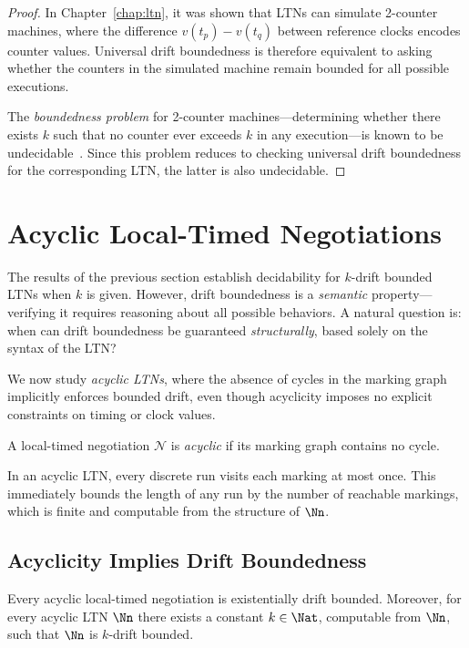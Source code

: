 \begin{proof}
In Chapter~\ref{chap:ltn}, it was shown that LTNs can simulate 2-counter machines, where the difference $v(t_p) - v(t_q)$ between reference clocks encodes counter values. Universal drift boundedness is therefore equivalent to asking whether the counters in the simulated machine remain bounded for all possible executions.

The \emph{boundedness problem} for 2-counter machines—determining whether there exists $k$ such that no counter ever exceeds $k$ in any execution—is known to be undecidable~\cite{Minsky67}. Since this problem reduces to checking universal drift boundedness for the corresponding LTN, the latter is also undecidable.
\end{proof}

\section{Acyclic Local-Timed Negotiations}
\label{sec:acyclic}

The results of the previous section establish decidability for $k$-drift bounded LTNs when $k$ is given. However, drift boundedness is a \emph{semantic} property—verifying it requires reasoning about all possible behaviors. A natural question is: when can drift boundedness be guaranteed \emph{structurally}, based solely on the syntax of the LTN?

We now study \emph{acyclic LTNs}, where the absence of cycles in the marking graph implicitly enforces bounded drift, even though acyclicity imposes no explicit constraints on timing or clock values.

\begin{definition}
\label{def:acyclic-ltn}
A local-timed negotiation $\mathcal{N}$ is \emph{acyclic} if its marking graph contains no cycle.
\end{definition}

In an acyclic LTN, every discrete run visits each marking at most once. This immediately bounds the length of any run by the number of reachable markings, which is finite and computable from the structure of $\Nn$.

\subsection{Acyclicity Implies Drift Boundedness}

\begin{theorem}
\label{thm:acyclic-drift-bounded}
Every acyclic local-timed negotiation is existentially drift bounded. Moreover, for every acyclic LTN $\Nn$ there exists a constant $k \in \Nat$, computable from $\Nn$, such that $\Nn$ is $k$-drift bounded.
\end{theorem}


